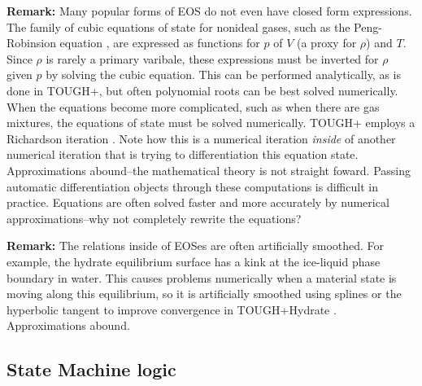 \documentclass[AMA,STIX1COL]{WileyNJD-v2}
\begin{document}
{\bf Remark:} Many popular forms of EOS do not even have closed form
expressions. The family of cubic equations of state for nonideal
gases, such as the Peng-Robinsion equation \cite{peng_new_1976}, are
expressed as functions for $p$ of $V$ (a proxy for $\rho$) and
$T$. Since $\rho$ is rarely a primary varibale, these expressions must be inverted for
$\rho$ given $p$ by solving the cubic equation. This can be performed
analytically, as is done in TOUGH+, but often polynomial roots can
be best solved numerically. When the equations become more
complicated, such as when there are gas mixtures, the equations of
state must be solved numerically. TOUGH+ employs a Richardson
iteration \cite{moridis_users_2014-2}.
Note how this is a numerical
iteration {\em inside} of another numerical iteration that is trying
to differentiation this equation state. Approximations
abound--the mathematical theory is not straight foward. Passing
automatic differentiation objects through these computations is
difficult in practice. Equations are
often solved faster and more accurately by numerical
approximations--why not completely rewrite the equations?

{\bf Remark:} The relations inside of EOSes are often artificially
smoothed. For example, the hydrate equilibrium surface has a kink at
the ice-liquid phase boundary in water. This causes problems
numerically when a material state is moving along this equilibrium, so
it is artificially smoothed using splines or the hyperbolic tangent to
improve convergence in TOUGH+Hydrate \cite{moridis_users_2014}. Approximations abound. 


\hypertarget{header-n3253}{%
\subsection{State Machine logic}\label{header-n3253}}
\end{document}
